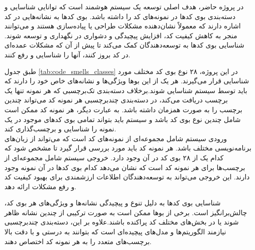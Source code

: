 در پروژه حاضر، هدف اصلی توسعه یک سیستم هوشمند است که توانایی شناسایی و دسته‌بندی بوی کدها در نمونه‌های کد را داشته باشد. بوی کدها به نشانه‌هایی در کد اشاره دارند که معمولاً نشان‌دهنده مشکلات طراحی یا پیاده‌سازی هستند و می‌توانند منجر به کاهش کیفیت کد، افزایش پیچیدگی و دشواری در نگهداری و توسعه شوند. شناسایی بوی کدها به توسعه‌دهندگان کمک می‌کند تا پیش از آن که مشکلات عمده‌ای در کد بروز کنند، آنها را شناسایی و رفع کنند.

طبق جدول \ref{tab:code_smells_classes}
در این پروژه، ۲۸ نوع بوی کد مختلف مورد شناسایی قرار می‌گیرند. هر یک از این بوها ویژگی‌ها و نشانه‌های خاص خود را دارند که باید توسط سیستم شناسایی شوند.برخلاف دسته‌بندی تک‌برچسبی که هر نمونه تنها یک برچسب دریافت می‌کند، در دسته‌بندی چندبرچسبی هر نمونه کد می‌تواند چندین برچسب را به صورت همزمان داشته باشد. به عبارت دیگر، هر نمونه کد ممکن است شامل چندین نوع بوی کد باشد و سیستم باید بتواند تمامی بوی کدهای موجود در یک نمونه را شناسایی و برچسب‌گذاری کند.
\\
ورودی سیستم شامل مجموعه‌ای از نمونه‌های کد است که می‌تواند از زبان‌های برنامه‌نویسی مختلف باشد. هر نمونه کد باید مورد بررسی قرار گیرد تا مشخص شود که کدام یک از ۲۸ بوی کد در آن وجود دارد.
خروجی سیستم شامل مجموعه‌ای از برچسب‌ها برای هر نمونه کد است که نشان می‌دهد کدام بوی کدها در آن نمونه وجود دارند. این خروجی می‌تواند به توسعه‌دهندگان اطلاعات ارزشمندی برای بهبود کیفیت کد و رفع مشکلات ارائه دهد.
\clearpage


شناسایی بوی کدها به دلیل تنوع و پیچیدگی نشانه‌ها و ویژگی‌های هر بوی کد، چالش‌برانگیز است. برخی از بوها ممکن است به صورت ترکیبی از چندین نشانه ظاهر شوند یا در بخش‌های مختلف کد پراکنده باشند.علاوه بر این، دسته‌بندی چندبرچسبی نیازمند الگوریتم‌ها و مدل‌های پیچیده‌ای است که بتوانند به درستی و با دقت بالا برچسب‌های متعدد را به هر نمونه کد اختصاص دهند.\cite{guggulothu2019codesmelldetectionusing}\cite{guggulothu2020code}
\clearpage